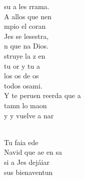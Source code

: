 \documentclass[12pt]{article}
\begin{document}
\begin{multicols*}{2}
\begin{cancion}
	su a les rrama. \\
\jump
	A allos que nen \\
	mpio el coran\\
	Jes se lesestra, \\
	n que na Dios.\\
\jump
	struye la z en \\
	tu or y tu a\\
	los os de os \\
	todos osami.  \\
\jump
	Y te peruen reerda que a \\
	tamn lo maon \\
	y y vuelve a nar\\\jump\\
	\begin{chorus}%
	Tu faia ede  \\
	Navid que ae en sa\\
	si a Jes dejáiar\\
	 sus bienaventun   \\
	\end{chorus}%
	\jump\\
\end{cancion}%


\end{multicols*}
\end{document}
